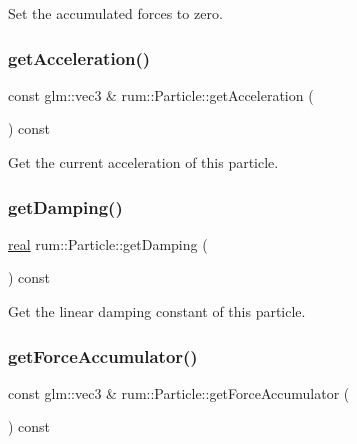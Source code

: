 Set the accumulated forces to zero. \mbox{\label{classrum_1_1_particle_a0f10955af0147e9c4c65f606bfe33d2c}} 
\subsubsection{\texorpdfstring{get\+Acceleration()}{getAcceleration()}}
{\footnotesize\ttfamily const glm\+::vec3 \& rum\+::\+Particle\+::get\+Acceleration (\begin{DoxyParamCaption}{ }\end{DoxyParamCaption}) const}

Get the current acceleration of this particle. \mbox{\label{classrum_1_1_particle_acf395f41a9fa123f996e5315ce641aa3}} 
\subsubsection{\texorpdfstring{get\+Damping()}{getDamping()}}
{\footnotesize\ttfamily \mbox{\hyperlink{namespacerum_a7e8cca23573d5eaead0f138cbaa4862c}{real}} rum\+::\+Particle\+::get\+Damping (\begin{DoxyParamCaption}{ }\end{DoxyParamCaption}) const}

Get the linear damping constant of this particle. \mbox{\label{classrum_1_1_particle_a9eefff658cc950952153aefc58d6bea6}} 
\subsubsection{\texorpdfstring{get\+Force\+Accumulator()}{getForceAccumulator()}}
{\footnotesize\ttfamily const glm\+::vec3 \& rum\+::\+Particle\+::get\+Force\+Accumulator (\begin{DoxyParamCaption}{ }\end{DoxyParamCaption}) const}

